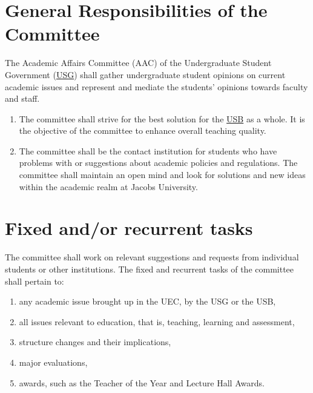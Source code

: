 \documentclass[12pt]{LaTeX_Misc/constitution}
\begin{document}
\label{AACByLawsdef}
\section{General Responsibilities of the Committee}
The Academic Affairs Committee (AAC) of the Undergraduate Student Government (\hyperref[USGdef]{USG}) shall gather undergraduate student opinions on current academic issues and represent and mediate the students' opinions towards faculty and staff. 

\begin{enumerate}[label={\textbf{\S\arabic*}}]
\item 
The committee shall strive for the best solution for the \hyperref[studentbody]{USB} as a whole. It is the objective of the committee to enhance overall teaching quality.

\item The committee shall be the contact institution for students who have problems with or suggestions about academic policies and regulations. The committee shall maintain an open mind and look for solutions and new ideas within the academic realm at Jacobs University.
\end{enumerate}

\section{Fixed and/or recurrent tasks}

The committee shall work on relevant suggestions and requests from individual students or other institutions. The fixed and recurrent tasks of the committee shall pertain to:

\begin{enumerate}

\item 
any academic issue brought up in the UEC, by the USG or the USB,

\item
all issues relevant to education, that is, teaching, learning and assessment, 

\item 
structure changes and their implications,

\item
major evaluations,

\item
awards, such as the Teacher of the Year and Lecture Hall Awards.
\end{enumerate}
\end{document}
